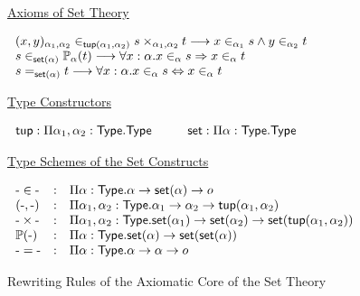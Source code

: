 \begin{figure}[t]
\small
\hspace{0.2cm}\underline{Axioms of Set Theory}
\begin{flushleft}
$\begin{array}{@{\hspace{0.2cm}}l}
(x,y)_{\alpha_1,\alpha_2}\in_{\tuple{\alpha_1}{\alpha_2}}s\times_{\alpha_1,\alpha_2}t\rew
x\in_{\alpha_1}s\land{}y\in_{\alpha_2}t\\
s\in_{\set{\alpha}}\mathbb{P}_\alpha(t)\rew
\forall{}x:\alpha.x\in_\alpha{}s\Rightarrow{}x\in_\alpha{}t\\
s=_{\set{\alpha}}t\rew
\forall{}x:\alpha.x\in_\alpha{}s\Leftrightarrow{}x\in_\alpha{}t
\end{array}$
\end{flushleft}
\hspace{0.2cm}\underline{Type Constructors}
\begin{flushleft}
$\begin{array}{@{\hspace{0.2cm}}l@{\hspace{1.0cm}}l}
\mathsf{tup}:\Pi\alpha_1,\alpha_2:\type.\type &
\mathsf{set}:\Pi\alpha:\type.\type
\end{array}$
\end{flushleft}
\hspace{0.2cm}\underline{Type Schemes of the Set Constructs}
\begin{flushleft}
$\begin{array}{@{\hspace{0.2cm}}lcl}
\arg\in\arg & : &
\Pi\alpha:\type.\alpha\rightarrow\set{\alpha}\rightarrow\omicron\\
(\arg,\arg) & : &
\Pi\alpha_1,\alpha_2:\type.\alpha_1\rightarrow\alpha_2\rightarrow
\tuple{\alpha_1}{\alpha_2}\\
\arg\times\arg & : &
\Pi\alpha_1,\alpha_2:\type.\set{\alpha_1}\rightarrow\set{\alpha_2}\rightarrow
\set{\tuple{\alpha_1}{\alpha_2}}\\
\mathbb{P}(\arg) & : &
\Pi\alpha:\type.\set{\alpha}\rightarrow\set{\set{\alpha}}\\
\arg=\arg & : & \Pi\alpha:\type.\alpha\rightarrow\alpha\rightarrow\omicron\\
\end{array}$
\end{flushleft}
\caption{Rewriting Rules of the Axiomatic Core of the \bmth{} Set Theory}
\label{fig:bset}
\end{figure}

